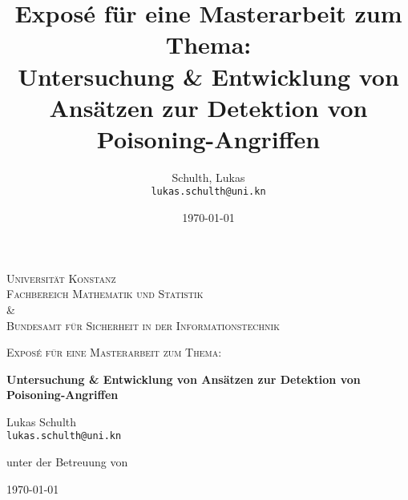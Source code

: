 \documentclass{article}
\title{%
	\large Exposé für eine Masterarbeit zum Thema: \\
	\LARGE \textbf{Untersuchung \& Entwicklung von Ansätzen zur Detektion von Poisoning-Angriffen}}
\author{Schulth, Lukas\\
	\texttt{lukas.schulth@uni.kn}
}
\date{\today}
\theoremstyle{break}
\begin{document}
	\begin{titlepage}
		\centering
		
		\vspace{1cm}
		{\scshape\LARGE Universität Konstanz\\
			Fachbereich Mathematik und Statistik\\ \& \\Bundesamt für Sicherheit in der Informationstechnik \par}
		\vspace{1cm}
		{\scshape\Large Exposé für eine Masterarbeit zum Thema:\par}
		\vspace{0.5cm}
		{\huge\bfseries Untersuchung \& Entwicklung von Ansätzen zur Detektion von Poisoning-Angriffen\par}
		\vspace{2cm}
		{\Large Lukas Schulth\\
			\texttt{lukas.schulth@uni.kn}\par}
		\vspace{2cm}
		unter der Betreuung von\par
		\begin{figure}[h]
		
		\end{figure}
		
		\vfill
		
		{\large \today\par}
		
		
		
	\end{titlepage}
\newpage
\tableofcontents

\newpage
\end{document}
